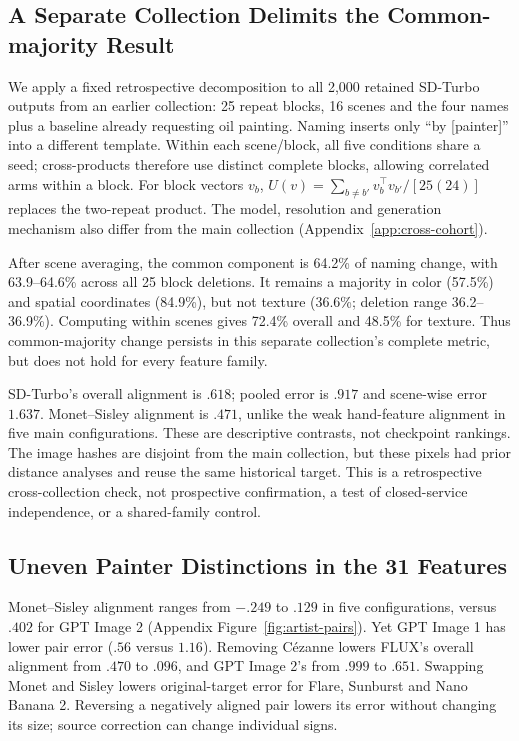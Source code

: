 \subsection{A Separate Collection Delimits the Common-majority Result}\label{sec:cross-cohort}
We apply a fixed retrospective decomposition to all 2,000 retained SD-Turbo
outputs from an earlier collection: 25 repeat blocks, 16 scenes and the four
names plus a baseline already requesting oil painting. Naming inserts only
``by [painter]'' into a different template. Within each scene/block, all five
conditions share a seed; cross-products therefore use distinct complete
blocks, allowing correlated arms within a block. For block vectors $v_b$,
$U(v)=\sum_{b\ne b'}v_b^\top v_{b'}/[25(24)]$ replaces the two-repeat product.
The model, resolution and generation mechanism also differ from the main
collection (Appendix~\ref{app:cross-cohort}).

After scene averaging, the common component is 64.2\% of naming change,
with 63.9--64.6\% across all 25 block deletions. It remains a majority in
color (57.5\%) and spatial coordinates (84.9\%), but not texture (36.6\%;
deletion range 36.2--36.9\%). Computing within scenes gives 72.4\% overall
and 48.5\% for texture. Thus common-majority change persists in this separate
collection's complete metric, but does not hold for every feature family.

SD-Turbo's overall alignment is $.618$; pooled error is $.917$ and scene-wise
error $1.637$. Monet--Sisley alignment is $.471$, unlike the weak hand-feature
alignment in five main configurations. These are descriptive contrasts,
not checkpoint rankings. The image hashes are disjoint from the main collection,
but these pixels had prior distance analyses and reuse the same historical
target. This is a retrospective cross-collection check, not prospective
confirmation, a test of closed-service independence, or a shared-family control.

\subsection{Uneven Painter Distinctions in the 31 Features}
Monet--Sisley alignment ranges from $-.249$ to $.129$ in five configurations,
versus $.402$ for GPT Image 2 (Appendix Figure~\ref{fig:artist-pairs}). Yet GPT
Image 1 has lower pair error ($.56$ versus $1.16$). Removing C\'ezanne lowers
FLUX's overall alignment from $.470$ to $.096$, and GPT Image 2's from $.999$
to $.651$. Swapping Monet and Sisley lowers original-target error for Flare,
Sunburst and Nano Banana 2. Reversing a negatively aligned pair lowers its
error without changing its size; source correction can change individual signs.

